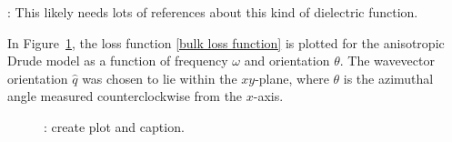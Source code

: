 : This likely needs lots of references about this kind of dielectric function.

In Figure~\ref{figure: anisotropic plasmon spectrum}, the loss function \eqref{bulk loss function} is plotted for the anisotropic Drude model as a function of frequency $\omega$ and orientation $\theta$.  The wavevector orientation $\hat q$ was chosen to lie within the $xy$-plane, where $\theta$ is the azimuthal angle measured counterclockwise from the $x$-axis.  

\begin{figure}
    \centering
    \caption{
        : create plot and caption.
    }
    \label{figure: anisotropic plasmon spectrum}
\end{figure}